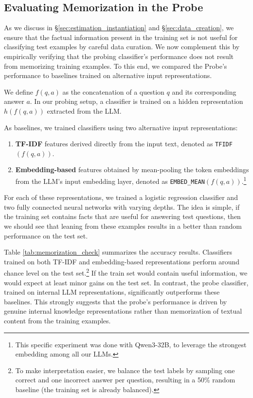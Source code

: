 \subsection{Evaluating Memorization in the Probe}
\label{sec:memorization_eval}


As we discuss in \S \ref{sec:estimation_instantiation} and \S \ref{sec:data_creation}, we ensure that the factual information present in the training set is not useful for classifying test examples by careful data curation. We now complement this by  empirically verifying that the probing classifier's performance does not result from memorizing training examples.
To this end, we compared the Probe's performance to baselines trained on alternative input representations. 

We define $f(q, a)$ as the concatenation of a question $q$ and its corresponding answer $a$. In our probing setup, a classifier is trained on a hidden representation $h(f(q, a))$ extracted from the LLM.

As baselines, we trained classifiers using two alternative input representations:

\begin{enumerate}
\item \textbf{TF-IDF} features derived directly from the input text, denoted as \texttt{TFIDF$(f(q,a))$}.
\item \textbf{Embedding-based} features obtained by mean-pooling the token embeddings from the LLM's input embedding layer, denoted as \texttt{EMBED\_MEAN$(f(q,a))$}.\footnote{This specific experiment was done with Qwen3-32B, to leverage the strongest embedding among all our LLMs.}
\end{enumerate}

For each of these representations, we trained a logistic regression classifier and two fully connected neural networks with varying depths.
The idea is simple, if the training set contains facts that are useful for answering test questions, then we should see that leaning from these examples results in a better than random performance on the  test set. 

Table \ref{tab:memorization_check} summarizes the accuracy results. Classifiers trained on both TF-IDF and embedding-based representations perform around chance level on the test set.\footnote{To make interpretation easier, we balance the test labels by sampling one correct and one incorrect answer per question, resulting in a 50\% random baseline (the training set is already balanced).}
If the train set would contain useful information, we would expect at least minor gains on the test set.
In contrast, the probe classifier, trained on internal LLM representations, significantly outperforms these baselines. This strongly suggests that the probe's performance is driven by genuine internal knowledge representations rather than memorization of textual content from the training examples.


